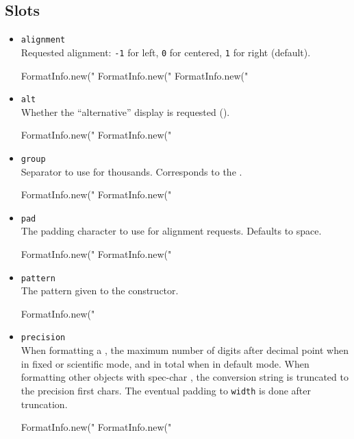 \subsection{Slots}
\begin{itemize}
\item \lstinline|alignment|\\
  Requested alignment: \lstinline|-1| for left, \lstinline|0| for
  centered, \lstinline|1| for right (default).
\begin{urbiassert}
FormatInfo.new("%
FormatInfo.new("%
FormatInfo.new("%
\end{urbiassert}

\item \lstinline|alt|\\
  Whether the ``alternative'' display is requested (\samp{\#}).
\begin{urbiassert}
FormatInfo.new("%
FormatInfo.new("%
\end{urbiassert}

\item \lstinline|group|\\
  Separator to use for thousands.  Corresponds to the 
  .
\begin{urbiassert}
FormatInfo.new("%
FormatInfo.new("%
\end{urbiassert}

\item \lstinline|pad|\\
  The padding character to use for alignment requests.  Defaults to space.
\begin{urbiassert}
FormatInfo.new("%
FormatInfo.new("%
\end{urbiassert}

\item \lstinline|pattern|\\
  The pattern given to the constructor.
\begin{urbiassert}
FormatInfo.new("%
\end{urbiassert}

\item \lstinline|precision|\\
  When formatting a , the maximum number of digits
  after decimal point when in fixed or scientific mode, and in total
  when in default mode.  When formatting other objects with spec-char
  , the conversion string is truncated to the precision first
  chars. The eventual padding to \lstinline|width| is done after
  truncation.
\begin{urbiassert}
FormatInfo.new("%
FormatInfo.new("%
\end{urbiassert}


\end{itemize}

